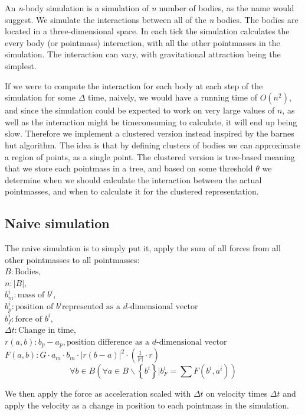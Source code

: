 An \textit{n}-body simulation is a simulation of \textit{n} number of bodies, as
the name would suggest. We simulate the interactions between all of the
\textit{n} bodies. The bodies are located in a three-dimensional space. In each
tick the simulation calculates the every body (or pointmass) interaction, with
all the other pointmasses in the simulation. The interaction can vary, with
gravitational attraction being the simplest.

If we were to compute the interaction for each body at each step of the
simulation for some $\Delta$ time, naively, we would have a running time of
$O(n^2)$, and since the simulation could be expected to work on very large
values of $n$, as well as the interaction might be timeconsuming to calculate,
it will end up being slow. Therefore we implement a clustered version instead
inspired by the barnes hut algorithm. The idea is that by defining clusters of
bodies we can approximate a region of points, as a single point. The clustered
version is tree-based meaning that we store each pointmass in a tree, and based
on some threshold $\theta$ we determine when we should calculate the interaction
between the actual pointmasses, and when to calculate it for the clustered
representation.
\subsection{Naive simulation}
The naive simulation is to simply put it, apply the sum of all forces from all
other pointmasses to all pointmasses:         \\
$B: \mbox{Bodies},$                           \\
$n: |B|,$                                     \\
$b^i_m: \mbox{mass of } b^i,$                 \\
$b^i_p: \mbox{position of } b^i \mbox{represented as a $d$-dimensional vector}$\\
$b^i_f: \mbox{force of } b^i,$                \\
$\Delta t: \mbox{Change in time},$                \\
$r(a, b): b_p - a_p, \mbox{position difference as a $d$-dimensional vector}$\\
$F(a, b): G \cdot a_m \cdot b_m \cdot |r(b - a)|^2 \cdot (\frac{1}{|r|} \cdot r)$
$$\forall b \in B (\forall a \in B \backslash \left\{ b^i\right\} | b^i_F = \sum F(b^i, a^i))$$

We then apply the force as acceleration scaled with $\Delta t$ on velocity
times $\Delta t$ and apply the velocity as a change in position to each
pointmass in the simulation.

